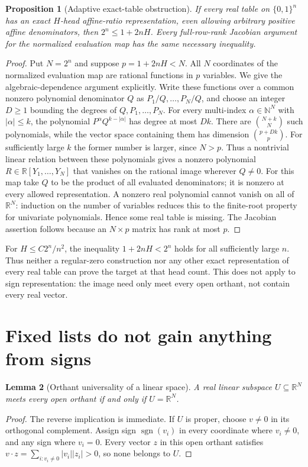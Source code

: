 \documentclass[11pt]{article}
\newtheorem{proposition}{Proposition}
\newtheorem{lemma}[proposition]{Lemma}
\newcommand{\Qn}{\{0,1\}^n}
\begin{document}
\begin{proposition}[Adaptive exact-table obstruction]
If every real table on $\Qn$ has an exact $H$-head affine-ratio
representation, even allowing arbitrary positive affine denominators,
then $2^n\le 1+2nH$.
Every full-row-rank Jacobian argument for the normalized evaluation map
has the same necessary inequality.
\end{proposition}
\begin{proof}
Put $N=2^n$ and suppose $p=1+2nH<N$.
All $N$ coordinates of the normalized evaluation map are rational
functions in $p$ variables. We give the algebraic-dependence argument
explicitly. Write these functions over a common nonzero polynomial
denominator $Q$ as $P_1/Q,\ldots,P_N/Q$, and choose an integer
$D\ge1$ bounding the degrees of $Q,P_1,\ldots,P_N$.
For every multi-index $\alpha\in\mathbb N^N$ with $|\alpha|\le k$,
the polynomial $P^\alpha Q^{k-|\alpha|}$ has degree at most $Dk$.
There are $\binom{N+k}{N}$ such polynomials, while the vector space
containing them has dimension $\binom{p+Dk}{p}$.
For sufficiently large $k$ the former number is larger, since $N>p$.
Thus a nontrivial linear relation between these polynomials gives a
nonzero polynomial $R\in\mathbb R[Y_1,\ldots,Y_N]$ that vanishes on
the rational image wherever $Q\ne0$.
For this map take $Q$ to be the product of all evaluated denominators;
it is nonzero at every allowed representation.
A nonzero real polynomial cannot vanish on all of $\mathbb R^N$:
induction on the number of variables reduces this to the finite-root
property for univariate polynomials. Hence some real table is missing.
The Jacobian assertion follows because an $N\times p$ matrix has
rank at most $p$.
\end{proof}

For $H\le C2^n/n^2$, the inequality $1+2nH<2^n$ holds for all
sufficiently large $n$. Thus neither a regular-zero construction nor
any other exact representation of every real table can prove the target
at that head count. This does not apply to sign representation: the
image need only meet every open orthant, not contain every real vector.

\section{Fixed lists do not gain anything from signs}

\begin{lemma}[Orthant universality of a linear space]
A real linear subspace $U\subseteq\mathbb R^N$ meets every open
orthant if and only if $U=\mathbb R^N$.
\end{lemma}
\begin{proof}
The reverse implication is immediate. If $U$ is proper, choose
$v\ne0$ in its orthogonal complement. Assign sign $\operatorname{sgn}(v_i)$
in every coordinate where $v_i\ne0$, and any sign where $v_i=0$.
Every vector $z$ in this open orthant satisfies
$v\cdot z=\sum_{i:v_i\ne0}|v_i||z_i|>0$, so none belongs to $U$.
\end{proof}
\end{document}
